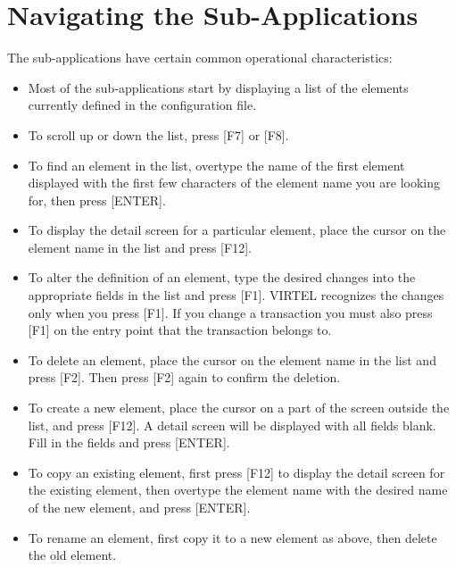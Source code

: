 \documentclass[letterpaper,10pt,english]{sphinxmanual}
\begin{document}
\section{Navigating the Sub-Applications}
\label{\detokenize{connectivity_guide:navigating-the-sub-applications}}
The sub-applications have certain common operational characteristics:
\begin{itemize}
\item {} 
Most of the sub-applications start by displaying a list of the elements currently defined in the configuration file.

\item {} 
To scroll up or down the list, press {[}F7{]} or {[}F8{]}.

\item {} 
To find an element in the list, overtype the name of the first element displayed with the first few characters of the element name you are looking for, then press {[}ENTER{]}.

\item {} 
To display the detail screen for a particular element, place the cursor on the element name in the list and press {[}F12{]}.

\item {} 
To alter the definition of an element, type the desired changes into the appropriate fields in the list and press {[}F1{]}. VIRTEL recognizes the changes only when you press {[}F1{]}. If you change a transaction you must also press {[}F1{]} on the entry point that the transaction belongs to.

\item {} 
To delete an element, place the cursor on the element name in the list and press {[}F2{]}. Then press {[}F2{]} again to confirm the deletion.

\item {} 
To create a new element, place the cursor on a part of the screen outside the list, and press {[}F12{]}. A detail screen will be displayed with all fields blank. Fill in the fields and press {[}ENTER{]}.

\item {} 
To copy an existing element, first press {[}F12{]} to display the detail screen for the existing element, then overtype the element name with the desired name of the new element, and press {[}ENTER{]}.

\item {} 
To rename an element, first copy it to a new element as above, then delete the old element.

\end{itemize}
\end{document}
